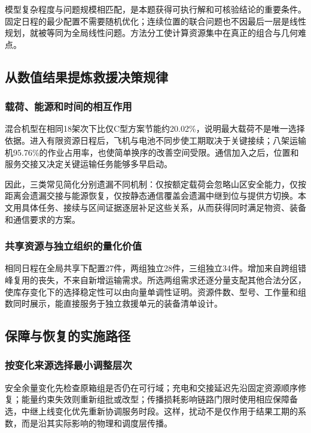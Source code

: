 模型复杂程度与问题规模相匹配，是本题获得可执行解和可核验结论的重要条件。固定日程的最少配置不需要随机优化；连续位置的联合问题也不因最后一层是线性规划，就被等同为全局线性问题。方法分工使计算资源集中在真正的组合与几何难点。

\subsection{从数值结果提炼救援决策规律}
\subsubsection{载荷、能源和时间的相互作用}
混合机型在相同18架次下比仅C型方案节能约20.02\%，说明最大载荷不是唯一选择依据。进入有限资源日程后，飞机与电池不同步使工期取决于关键接续；八架运输机95.76\%的作业占用率，也使简单换序的改善空间受限。通信加入之后，位置和服务交接又决定关键运输任务能够多早启动。

因此，三类常见简化分别遗漏不同机制：仅按额定载荷会忽略山区安全能力，仅按距离会遗漏交接与能源恢复，仅按静态通信覆盖会遗漏中继到位与提供方切换。本文用具体任务、接续与区间证据逐层补足这些关系，从而获得同时满足物资、装备和通信要求的方案。

\subsubsection{共享资源与独立组织的量化价值}
相同日程在全局共享下配置27件，两组独立28件，三组独立34件。增加来自跨组错峰复用的丧失，不来自新增运输需求。所选两组需求还逐分量支配其他合法分区，使库存变化下的选择稳定性可以由向量单调性证明。资源件数、型号、工作量和组数同时展示，能直接服务于独立救援单元的装备清单设计。

\subsection{保障与恢复的实施路径}
\subsubsection{按变化来源选择最小调整层次}
安全余量变化先检查原箱组是否仍在可行域；充电和交接延迟先沿固定资源顺序修复；能量约束失效则重新组批或改型；传播损耗影响链路门限时使用相应保障备选，中继上线变化优先重新协调服务时段。这样，扰动不是仅作用于结果工期的系数，而是沿其实际影响的物理和调度层传播。

